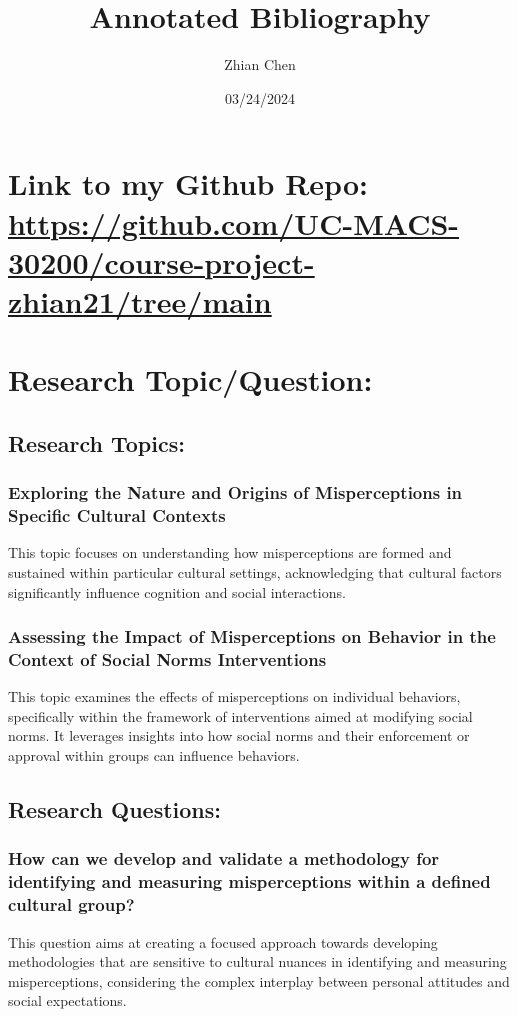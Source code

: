 \documentclass{article}
\title{Annotated Bibliography}
\author{Zhian Chen}
\date{03/24/2024}
\begin{document}
\maketitle


\section{\textbf{Link to my Github Repo:} \url{https://github.com/UC-MACS-30200/course-project-zhian21/tree/main}}

\section{\textbf{Research Topic/Question:} }
\subsection{\textbf{Research Topics}:}
\subsubsection{{Exploring the Nature and Origins of Misperceptions in Specific Cultural Contexts}}
{This topic focuses on understanding how misperceptions are formed and sustained within particular cultural settings, acknowledging that cultural factors significantly influence cognition and social interactions.}\\
\subsubsection{Assessing the Impact of Misperceptions on Behavior in the Context of Social Norms Interventions}
{This topic examines the effects of misperceptions on individual behaviors, specifically within the framework of interventions aimed at modifying social norms. It leverages insights into how social norms and their enforcement or approval within groups can influence behaviors.}\\

\subsection{\textbf{Research Questions}:}
\subsubsection{How can we develop and validate a methodology for identifying and measuring misperceptions within a defined cultural group?}
{This question aims at creating a focused approach towards developing methodologies that are sensitive to cultural nuances in identifying and measuring misperceptions, considering the complex interplay between personal attitudes and social expectations.}
\end{document}
